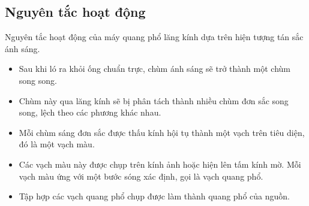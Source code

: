 	\subsection{Nguyên tắc hoạt động}
Nguyên tắc hoạt động của máy quang phổ lăng kính dựa trên hiện tượng tán sắc ánh sáng.
\begin{itemize}

\item Sau khi ló ra khỏi ống chuẩn trực, chùm ánh sáng sẽ trở thành một chùm song song. 

\item Chùm này qua lăng kính sẽ bị phân tách thành nhiều chùm đơn sắc song song, lệch theo các phương khác nhau. 

\item Mỗi chùm sáng đơn sắc được thấu kính hội tụ thành một vạch trên tiêu diện, đó là một vạch màu. 

\item Các vạch màu này được chụp trên kính ảnh hoặc hiện lên tấm kính mờ. Mỗi vạch màu ứng với một bước sóng xác định, gọi là vạch quang phổ. 
\item Tập hợp các vạch quang phổ chụp được làm thành quang phổ của nguồn.

\end{itemize}
